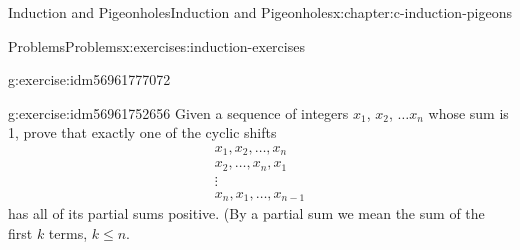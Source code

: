 \documentclass[twoside,10pt,]{book}
\numberwithin{equation}{section}
\begin{document}
\begin{chapterptx}{Induction and Pigeonholes}{}{Induction and Pigeonholes}{}{}{x:chapter:c-induction-pigeons}
\begin{exercises-section}{Problems}{}{Problems}{}{}{x:exercises:induction-exercises}
\begin{divisionexercise}{14}{}{}{g:exercise:idm56961777072}
\end{divisionexercise}%
\begin{divisionexercise}{15}{}{}{g:exercise:idm56961752656}%
Given a sequence of integers \(x_1\), \(x_2\), \(\dots x_n\) whose sum is 1, prove that exactly one of the cyclic shifts%
\begin{gather*}
x_1,x_2,\dots ,x_n \\
x_2,\dots,x_n,x_1  \\
\vdots    \\
x_n,x_1,\dots,x_{n-1}  
\end{gather*}
has all of its partial sums positive. (By a partial sum we mean the sum of the first \(k\) terms, \(k \leq  n\).%
\end{divisionexercise}%
\end{exercises-section}
\end{chapterptx}
%
%
\typeout{************************************************}
\typeout{************************************************}
%
\end{document}
